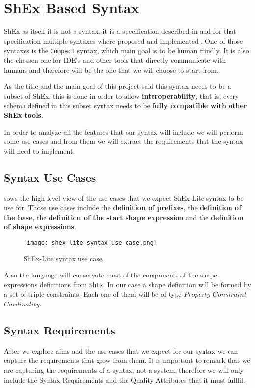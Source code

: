 \section{ShEx Based Syntax}

ShEx as itself it is not a syntax, it is a specification described in  
and for that specification multiple syntaxes where proposed and implemented .
One of those syntaxes is the \texttt{Compact} syntax, which main goal is to be human frindly. It is also
the chossen one for IDE's and other tools that directly communicate with humans and therefore will be the
one that we will choose to start from.

As the title and the main goal of this project said this syntax needs to be a subset of ShEx, this is done
in order to allow \textbf{interoperability}, that is, every schema defined in this subset syntax needs to be
\textbf{fully compatible with other ShEx tools}.

In order to analyze all the features that our syntax will include we will perform some use cases and from
them we will extract the requirements that the syntax will need to implement.

\subsection{Syntax Use Cases}

 sows the high level view of the use cases that we expect ShEx-Lite syntax
to be use for. Those use cases include the \textbf{definition of prefixes}, the \textbf{definition of the base},
the \textbf{definition of the start shape expression} and the \textbf{definition of shape expressions}.

\begin{figure*}[h!]
	\texttt{[image: shex-lite-syntax-use-case.png]}
	\caption[ShEx-Lite syntax use case]{ShEx-Lite syntax use case.}
\end{figure*}

Also the language will conservate most of the components of the shape expressions definitions from \texttt{ShEx}.
In our case a shape definition will be formed by a set of triple constraints. Each one of them will be of type
$Property$ $Constraint$ $Cardinality$.

\subsection{Syntax Requirements}
After we explore aims and the use cases that we expect for our syntax we can capture the requirements that grow
from them. It is important to remark that we are capturing the requirements of a syntax, not a system, therefore
we will only include the Syntax Requirements and the Quality Attributes that it must fullfil.

